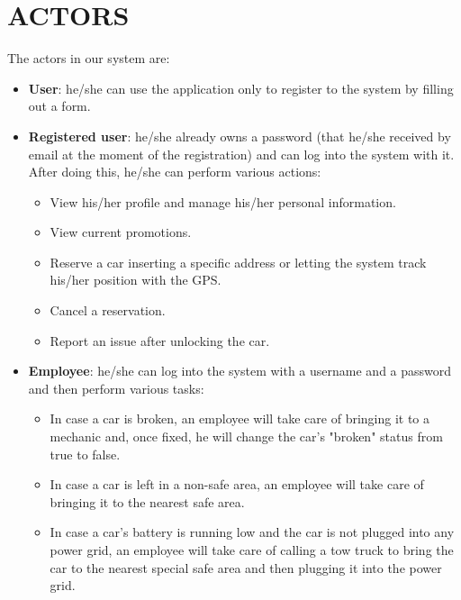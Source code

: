 \section{ACTORS}
The actors in our system are:
\begin{itemize}
	\item \textbf{User}: he/she can use the application only to register to the system by filling out a form.
	\item \textbf{Registered user}: he/she already owns a password (that he/she received by email at the moment of the registration) and can log into the system with it. After doing this, he/she can perform various actions:
	\begin{itemize}
		\item View his/her profile and manage his/her personal information.
		\item View current promotions.
		\item Reserve a car inserting a specific address or letting the system track his/her position with the GPS. 
		\item Cancel a reservation.
		\item Report an issue after unlocking the car.
	\end{itemize}
	\item \textbf{Employee}: he/she can log into the system with a username and a password and then perform various tasks:
	\begin{itemize}
		\item In case a car is broken, an employee will take care of bringing it to a mechanic and, once fixed, he will change the car's "broken" status from true to false.
		\item In case a car is left in a non-safe area, an employee will take care of bringing it to the nearest safe area.
		\item In case a car's battery is running low and the car is not plugged into any power grid, an employee will take care of calling a tow truck to bring the car to the nearest special safe area and then plugging it into the power grid. 
	\end{itemize}
\end{itemize}